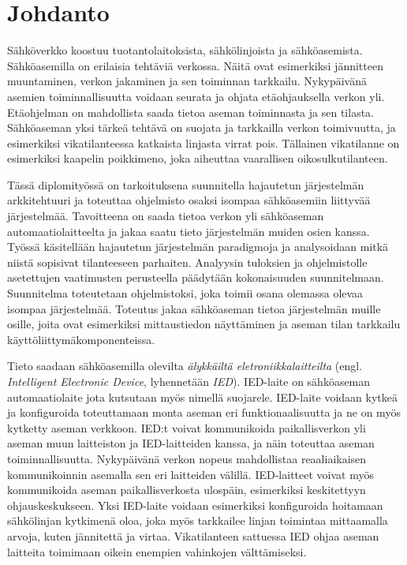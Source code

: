 \chapter{Johdanto}
\label{ch:johdanto}
Sähköverkko koostuu tuotantolaitoksista, sähkölinjoista ja sähköasemista. Sähköasemilla on erilaisia tehtäviä verkossa. Näitä ovat esimerkiksi jännitteen muuntaminen, verkon jakaminen ja sen toiminnan tarkkailu. Nykypäivänä asemien toiminnallisuutta voidaan seurata ja ohjata etäohjauksella verkon yli. Etäohjelman on mahdollista saada tietoa aseman toiminnasta ja sen tilasta. Sähköaseman yksi tärkeä tehtävä on suojata ja tarkkailla verkon toimivuutta, ja esimerkiksi vikatilanteessa katkaista linjasta virrat pois. Tällainen vikatilanne on esimerkiksi kaapelin poikkimeno, joka aiheuttaa vaarallisen oikosulkutilanteen.

Tässä diplomityössä on tarkoituksena suunnitella hajautetun järjestelmän arkkitehtuuri ja toteuttaa ohjelmisto osaksi isompaa sähköasemiin liittyvää järjestelmää. Tavoitteena on saada tietoa verkon yli sähköaseman automaatiolaitteelta ja jakaa saatu tieto järjestelmän muiden osien kanssa. Työssä käsitellään hajautetun järjestelmän paradigmoja ja analysoidaan mitkä niistä sopisivat tilanteeseen parhaiten. Analyysin tuloksien ja ohjelmistolle asetettujen vaatimusten perusteella päädytään kokonaisuuden suunnitelmaan. Suunnitelma toteutetaan ohjelmistoksi, joka toimii osana olemassa olevaa isompaa järjestelmää. Toteutus jakaa sähköaseman tietoa järjestelmän muille osille, joita ovat esimerkiksi mittaustiedon näyttäminen ja aseman tilan tarkkailu käyttöliittymäkomponenteissa.

Tieto saadaan sähköasemilla olevilta \emph{älykkäiltä eletroniikkalaitteilta} (engl. \emph{Intelligent Electronic Device}, lyhennetään \emph{IED}). IED-laite on sähköaseman automaatiolaite jota kutsutaan myös nimellä suojarele. IED-laite voidaan kytkeä ja konfiguroida toteuttamaan monta aseman eri funktionaalisuutta ja ne on myös kytketty aseman verkkoon. IED:t voivat kommunikoida paikallisverkon yli aseman muun laitteiston ja IED-laitteiden kanssa, ja näin toteuttaa aseman toiminnallisuutta. Nykypäivänä verkon nopeus mahdollistaa reaaliaikaisen kommunikoinnin asemalla sen eri laitteiden välillä. IED-laitteet voivat myös kommunikoida aseman paikallisverkosta ulospäin, esimerkiksi keskitettyyn ohjauskeskukseen. Yksi IED-laite voidaan esimerkiksi konfiguroida hoitamaan sähkölinjan kytkimenä oloa, joka myös tarkkailee linjan toimintaa mittaamalla arvoja, kuten jännitettä ja virtaa. Vikatilanteen sattuessa IED ohjaa aseman laitteita toimimaan oikein enempien vahinkojen välttämiseksi. \cite{Brunner2008}

